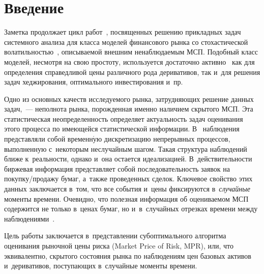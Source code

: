 
  



\thispagestyle{headings}

\begin{multicols}{2}

\label{st\stat}


\section{Введение}

Заметка продолжает цикл работ~\cite{B_23_1_IA, B_23_2_IA, B_23_3_IA}, 
посвященных решению прикладных задач сис\-тем\-но\-го анализа для класса моделей 
финансового рынка со стохастической волатильностью~\cite{AndersenBenzoni_09}, 
опи\-сы\-ва\-емой внеш\-ним ненаблюдаемым МСП.
Подобный класс моделей, несмотря на свою простоту, используется достаточно 
активно~\cite{MAMON_05, BoyleDraviam_07, mamon2014hidden} как для определения 
справедливой цены различного рода деривативов, так и~для решения задач 
хеджирования, оптимального инвестирования и~пр.

Одно из основных качеств исследуемого рынка, затрудняющих решение данных задач,~--- 
неполнота рынка, порожденная именно наличием скрытого МСП. Эта статистическая 
неопределенность определяет актуальность задач оценивания этого процесса по 
имеющейся статистической информации.  В~\cite{ B_23_3_IA} наблюдения 
представляли собой временн$\acute{\mbox{у}}$ю дискретизацию непрерывных процессов, 
выполненную с~некоторым неслучайным шагом. Такая структура наблюдений ближе к~реальности, 
однако и~она остается идеализацией. В~действительности биржевая информация 
представляет собой последовательность заявок на покупку/продажу бумаг, а~также 
проведенных сделок. Ключевое свойство этих данных заключается в~том, что все 
события и~цены фиксируются в~\textit{случайные} моменты времени. Очевидно, что 
полезная информация об оце\-ни\-ва\-емом МСП содержится не только в~ценах бумаг, но и~в~случайных отрезках времени между наблюдениями~\cite{Cvitanic_06}.

Цель работы заключается в~представлении субоптимального алгоритма оценивания 
рыночной цены риска (Market Price of Risk, MPR), или, что эквивалентно, скрытого 
состояния рынка по наблюдениям цен базовых активов и~деривативов, поступающих 
в~случайные моменты времени. 


\end{multicols}
